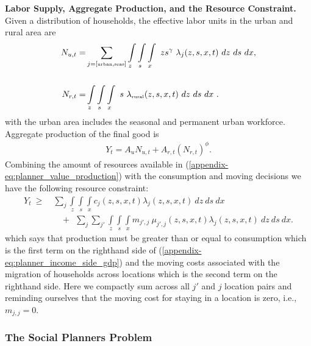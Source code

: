 \documentclass[12pt,pdftex]{article}
\begin{document}
\textbf{Labor Supply, Aggregate Production, and the Resource Constraint.} Given a distribution of households, the effective labor units in the urban and rural area are
\begin{align}
N_{u,t} =& \sum_{j = [\mbox{\tiny urban}, \mbox{\tiny seas}]}\int\limits_{z} \int\limits_{s} \int\limits_{x} \  z s^{\gamma} \ \lambda_j(z, s, x, t) \ dz \ ds \ dx, \nonumber
\\
\nonumber \\
N_{r,t} =& \int\limits_{z} \int\limits_{s} \int\limits_{x} \ s \ \lambda_{\mbox{\tiny rural}}(z, s, x, t)\ dz \ ds \ dx \ .
\label{appendix-eq:planner_labor_supply}
\end{align}
with the urban area includes the seasonal and permanent urban workforce. Aggregate production of the final good is
\begin{align}
Y_t = A_u N_{u,t} + A_{r,t} \left(N_{r,t} \right)^{\phi}.
\label{appendix-eq:planner_value_production}
\end{align}
Combining the amount of resources available in (\ref{appendix-eq:planner_value_production}) with the consumption and moving decisions we have the following resource constraint:
\begin{align}
Y_t\  \geq \ & \sum_{j} \int\limits_{z} \int\limits_{s} \int\limits_{x} c_{j}(z, s, x, t) \lambda_{j}(z, s, x, t) \ dz \ ds \ dx  \nonumber \\
& \ \ \ \ +  \ \  \sum_{j}\sum_{j'} \int\limits_{z} \int\limits_{s} \int\limits_{x}  m_{j',j} \ \mu_{j',j}(z,s, x, t) \lambda_{j}(z, s, x, t) \ dz \ ds \ dx.
\label{appendix-eq:planner_income_side_gdp}
\end{align}
which says that production must be greater than or equal to consumption which is the first term on the righthand side of (\ref{appendix-eq:planner_income_side_gdp}) and the moving costs associated with the migration of households across locations which is the second term on the righthand side. Here we compactly sum across all $j'$ and $j$ location pairs and reminding ourselves that the moving cost for staying in a location is zero, i.e., $m_{j,j} = 0$.

\subsubsection{The Social Planners Problem}
\end{document}
